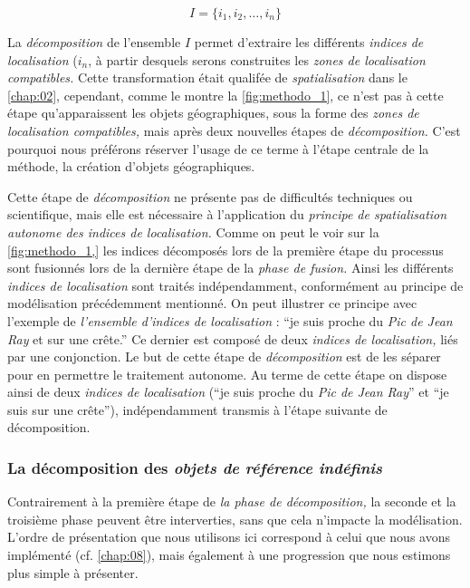 \begin{equation}
  I = \{i_1, i_2, \dots, i_n \}
\end{equation}

La \emph{décomposition} de l'ensemble \(I\) permet d'extraire les
différents \emph{indices de localisation} (\(i_n\), à partir desquels
serons construites les \emph{zones de localisation compatibles.} Cette
transformation était qualifée de \emph{spatialisation} dans le
\autoref{chap:02}, cependant, comme le montre la
\autoref{fig:methodo_1}, ce n'est pas à cette étape qu'apparaissent
les objets géographiques, sous la forme des \emph{zones de
  localisation compatibles,} mais après deux nouvelles étapes de
\emph{décomposition.} C'est pourquoi nous préférons réserver l'usage
de ce terme à l'étape centrale de la méthode, la création d'objets
géographiques.

Cette étape de \emph{décomposition} ne présente pas de difficultés
techniques ou scientifique, mais elle est nécessaire à l’application
du \emph{principe de spatialisation autonome des indices de
  localisation.} Comme on peut le voir sur la \autoref{fig:methodo_1,}
les indices décomposés lors de la première étape du processus sont
fusionnés lors de la dernière étape de la \emph{phase de fusion.}
Ainsi les différents \emph{indices de localisation} sont traités
indépendamment, conformément au principe de modélisation précédemment
mentionné. On peut illustrer ce principe avec l'exemple de
\emph{l'ensemble d'indices de localisation} : \enquote{je suis proche
  du \emph{Pic de Jean Ray} et sur une crête.} Ce dernier est composé
de deux \emph{indices de localisation,} liés par une conjonction. Le
but de cette étape de \emph{décomposition} est de les séparer pour en
permettre le traitement autonome. Au terme de cette étape on dispose
ainsi de deux \emph{indices de localisation} (\enquote{je suis proche
  du \emph{Pic de Jean Ray}} et \enquote{je suis sur une crête}),
indépendamment transmis à l'étape suivante de décomposition.

\subsubsection{La décomposition des \emph{objets de référence indéfinis}}

Contrairement à la première étape de \emph{la phase de décomposition,}
la seconde et la troisième phase peuvent être interverties, sans que
cela n'impacte la modélisation. L'ordre de présentation que nous
utilisons ici correspond à celui que nous avons implémenté
(cf. \autoref{chap:08}), mais également à une progression que nous
estimons plus simple à présenter.

